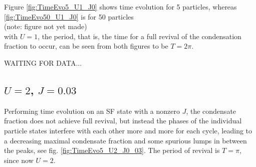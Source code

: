 Figure \ref{fig:TimeEvo5_U1_J0} shows time evolution for 5 particles, whereas \ref{fig:TimeEvo50_U1_J0} is for 50 particles \\(note: figure not yet made)\\ with $U=1$, the period, that is, the time for a full revival of the condensation fraction to occur, can be seen from both figures to be $T=2\pi$. 

WAITING FOR DATA...

\subsection{$U=2$, $J=0.03$}
Performing time evolution on an SF state with a nonzero $J$, the condensate fraction does not achieve full revival, but instead the phases of the individual particle states interfere with each other more and more for each cycle, leading to a decreasing maximal condensate fraction and some spurious lumps in between the peaks, see fig. \ref{fig:TimeEvo5_U2_J0_03}. The period of revival is $T=\pi$, since now $U=2$.

